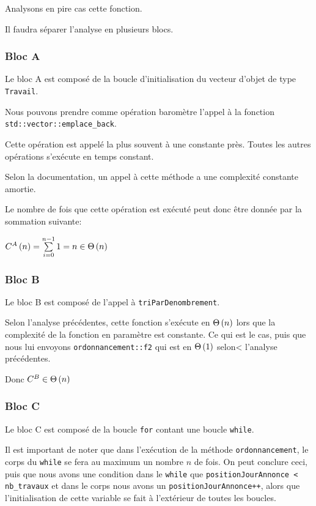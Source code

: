 \documentclass[class=article]{standalone}
\begin{document}
Analysons en pire cas cette fonction.

Il faudra séparer l'analyse en plusieurs blocs.

\subsubsection*{Bloc A}

Le bloc A est composé de la boucle d'initialisation du vecteur d'objet de type \lstinline{Travail}.

Nous pouvons prendre comme opération baromètre l'appel à la fonction \lstinline{std::vector::emplace_back}.

Cette opération est appelé la plus souvent à une constante près. Toutes les autres opérations s'exécute en temps constant.

Selon la documentation, un appel à cette méthode a une complexité constante amortie.

Le nombre de fois que cette opération est exécuté peut donc être donnée par la sommation suivante:

$C^A\left ( n \right ) = \sum\limits_{i=0}^{n-1}1 = n \in \Theta\left ( n \right )$

\subsubsection*{Bloc B}

Le bloc B est composé de l'appel à \lstinline{triParDenombrement}.

Selon l'analyse précédentes, cette fonction s'exécute en $\Theta\left ( n \right )$
lors que la complexité de la fonction en paramètre est constante. Ce qui est le cas,
puis que nous lui envoyons \lstinline{ordonnancement::f2} qui est en $\Theta\left ( 1 \right )$ selon<
l'analyse précédentes.

Donc $C^B \in \Theta\left ( n \right )$

\subsubsection*{Bloc C}

Le bloc C est composé de la boucle \lstinline{for} contant une boucle \lstinline{while}.

Il est important de noter que dans l'exécution de la méthode \lstinline{ordonnancement},
le corps du \lstinline{while} se fera au maximum un nombre $n$ de fois. On peut conclure ceci,
puis que nous avons une condition dans le \lstinline{while} que 
\lstinline{positionJourAnnonce < nb_travaux} et dans le corps nous avons un \lstinline{positionJourAnnonce++},
alors que l'initialisation de cette variable se fait à l'extérieur de toutes les boucles.
\end{document}
